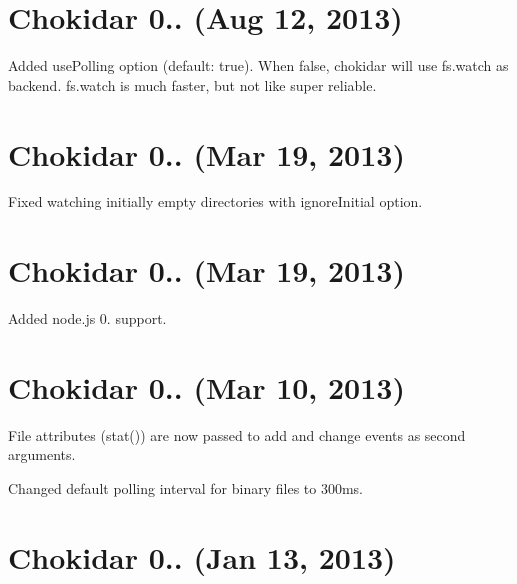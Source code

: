 \section*{Chokidar 0.. (Aug 12, 2013)}


\begin{DoxyItemize}
\item Added {\ttfamily use\+Polling} option (default\+: {\ttfamily true}). When {\ttfamily false}, chokidar will use {\ttfamily fs.\+watch} as backend. {\ttfamily fs.\+watch} is much faster, but not like super reliable.
\end{DoxyItemize}

\section*{Chokidar 0.. (Mar 19, 2013)}


\begin{DoxyItemize}
\item Fixed watching initially empty directories with {\ttfamily ignore\+Initial} option.
\end{DoxyItemize}

\section*{Chokidar 0.. (Mar 19, 2013)}


\begin{DoxyItemize}
\item Added node.\+js 0. support.
\end{DoxyItemize}

\section*{Chokidar 0.. (Mar 10, 2013)}


\begin{DoxyItemize}
\item File attributes (stat()) are now passed to {\ttfamily add} and {\ttfamily change} events as second arguments.
\item Changed default polling interval for binary files to 300ms.
\end{DoxyItemize}

\section*{Chokidar 0.. (Jan 13, 2013)}



